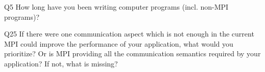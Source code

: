 \begin{description}%
\item{Q5} How long have you been writing computer programs (incl. non-MPI programs)?%
\item{Q25} If there were one communication aspect which is not enough in the current MPI could improve the performance of your application, what would you prioritize? Or is MPI providing all the communication semantics required by your application? If not, what is missing?%
\end{description}%
